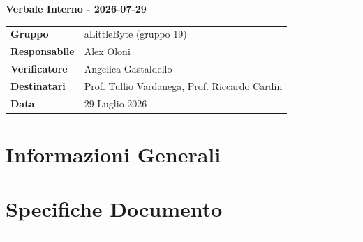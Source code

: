 \documentclass[a4paper,12pt]{article}
\begin{document}
\thispagestyle{firstpage}

\vspace*{0.5cm}

\begin{center}
    {\LARGE \textbf{Verbale Interno - 2026-07-29}}
\end{center}

\vspace{1.5cm}

\begin{center}
    \renewcommand{\arraystretch}{1.3}
    \begin{tcolorbox}[
        width=0.92\textwidth,
        colback=gray!6,
        colframe=gray!45,
        boxrule=0.5pt,
        arc=2mm,
        boxsep=0pt,
        left=8pt, right=8pt, top=8pt, bottom=8pt
    ]
        \begin{tabularx}{\linewidth}{>{\bfseries}p{3.5cm} X}
            Gruppo       & aLittleByte (gruppo 19) \\
            Responsabile & Alex Oloni \\
            Verificatore & Angelica Gastaldello\\
            Destinatari  & Prof. Tullio Vardanega, Prof. Riccardo Cardin \\
            Data         & 29 Luglio 2026\\
        \end{tabularx}
    \end{tcolorbox}
\end{center}

\newpage

\tableofcontents
\newpage
\section{Informazioni Generali}
\section*{Specifiche Documento}
\hrule
\vspace{1cm}
\end{document}
